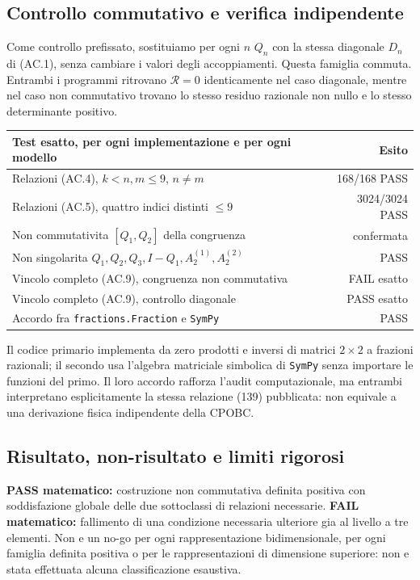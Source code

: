 \documentclass[11pt,a4paper]{article}
\begin{document}
\clearpage
\subsection*{Controllo commutativo e verifica indipendente}
Come controllo prefissato, sostituiamo per ogni $n$ $Q_n$ con la stessa diagonale $D_n$ di (AC.1), senza cambiare i valori degli accoppiamenti. Questa famiglia commuta. Entrambi i programmi ritrovano $\mathcal R=0$ identicamente nel caso diagonale, mentre nel caso non commutativo trovano lo stesso residuo razionale non nullo e lo stesso determinante positivo.

\begin{center}
\small
\begin{tabular}{p{8.7cm}r}
\toprule
Test esatto, per ogni implementazione e per ogni modello & Esito\\
\midrule
Relazioni (AC.4), $k<n,m\le9$, $n\ne m$ & 168/168 PASS\\
Relazioni (AC.5), quattro indici distinti $\le9$ & 3024/3024 PASS\\
Non commutativita $[Q_1,Q_2]$ della congruenza & confermata\\
Non singolarita $Q_1,Q_2,Q_3,I-Q_1,A_2^{(1)},A_2^{(2)}$ & PASS\\
Vincolo completo (AC.9), congruenza non commutativa & FAIL esatto\\
Vincolo completo (AC.9), controllo diagonale & PASS esatto\\
Accordo fra \texttt{fractions.Fraction} e \texttt{SymPy} & PASS\\
\bottomrule
\end{tabular}
\end{center}

Il codice primario implementa da zero prodotti e inversi di matrici $2\times2$ a frazioni razionali; il secondo usa l'algebra matriciale simbolica di \texttt{SymPy} senza importare le funzioni del primo. Il loro accordo rafforza l'audit computazionale, ma entrambi interpretano esplicitamente la stessa relazione (139) pubblicata: non equivale a una derivazione fisica indipendente della CPOBC.

\subsection*{Risultato, non-risultato e limiti rigorosi}
\textbf{PASS matematico:} costruzione non commutativa definita positiva con soddisfazione globale delle due sottoclassi di relazioni necessarie. \textbf{FAIL matematico:} fallimento di una condizione necessaria ulteriore gia al livello a tre elementi. Non e un no-go per ogni rappresentazione bidimensionale, per ogni famiglia definita positiva o per le rappresentazioni di dimensione superiore: non e stata effettuata alcuna classificazione esaustiva.
\end{document}
